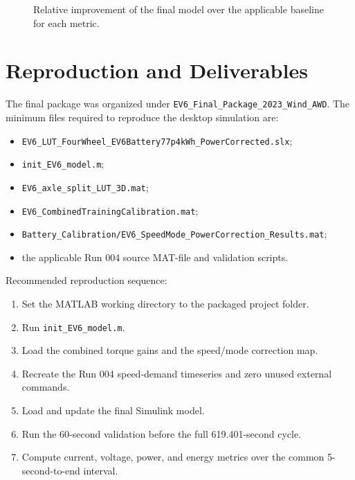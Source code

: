 \documentclass[11pt,letterpaper]{article}
\begin{document}
\begin{figure}[!htbp]
\centering
{}
\caption{Relative improvement of the final model over the applicable baseline for each metric.}
\end{figure}

\section{Reproduction and Deliverables}

The final package was organized under
\texttt{EV6\_Final\_Package\_2023\_Wind\_AWD}. The minimum files required to
reproduce the desktop simulation are:

\begin{itemize}
  \item \texttt{EV6\_LUT\_FourWheel\_EV6Battery77p4kWh\_PowerCorrected.slx};
  \item \texttt{init\_EV6\_model.m};
  \item \texttt{EV6\_axle\_split\_LUT\_3D.mat};
  \item \texttt{EV6\_CombinedTrainingCalibration.mat};
  \item \texttt{Battery\_Calibration/EV6\_SpeedMode\_PowerCorrection\_Results.mat};
  \item the applicable Run 004 source MAT-file and validation scripts.
\end{itemize}

Recommended reproduction sequence:

\begin{enumerate}
  \item Set the MATLAB working directory to the packaged project folder.
  \item Run \texttt{init\_EV6\_model.m}.
  \item Load the combined torque gains and the speed/mode correction map.
  \item Recreate the Run 004 speed-demand timeseries and zero unused external commands.
  \item Load and update the final Simulink model.
  \item Run the 60-second validation before the full 619.401-second cycle.
  \item Compute current, voltage, power, and energy metrics over the common 5-second-to-end interval.
\end{enumerate}
\end{document}

